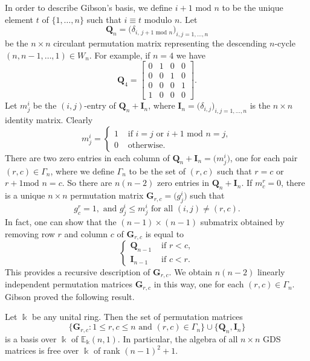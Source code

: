 \documentclass[ALCO,ThmDefs,Unicode,epreuves]{cedram}
\newcommand{\E}{\mathbb{E}}
\newcommand{\bQ}{\mathbf{Q}}
\newcommand{\bI}{\mathbf{I}}
\newcommand{\bG}{\mathbf{G}}
\begin{document}
In order to describe Gibson's basis, we define $i+1 \text{ mod } n$ to
be the unique element $t$ of $\{1, \dots, n\}$ such that $i \equiv t$
modulo $n$. Let
\[
\bQ_n = \big( \delta_{i,\, j+1 \text{ mod } n} \big)_{i,j = 1, \dots, n}
\]
be the $n \times n$ circulant permutation matrix representing the
descending $n$-cycle $(n, n-1, \dots, 1) \in W_n$. For example, if
$n=4$ we have
\[
\bQ_4 = 
\begin{bmatrix}
 0&1&0&0\\
 0&0&1&0\\
 0&0&0&1\\
 1&0&0&0
\end{bmatrix}.
\]
Let $m^i_j$ be the $(i,j)$-entry of $\bQ_n + \bI_n$, where $\bI_n =
\big( \delta_{i,j} \big)_{i,j = 1, \dots, n}$ is the $n \times n$
identity matrix. Clearly
\[ m^i_{j} = 
\begin{cases}
 1 & \text{ if } i=j \text{ or } i+1 \text{ mod } n = j,\\
 0 & \text{ otherwise.}
\end{cases}
\]
There are two zero entries in each column of $\bQ_n + \bI_n = \big(
m^i_{j} \big)$, one for each pair $(r,c) \in \Gamma_n$, where we define
$\Gamma_n$ to be the set of $(r,c)$ such that $r = c$ or $r+1 \text{
 mod } n = c$. So there are $n(n-2)$ zero entries in $\bQ_n +
\bI_n$. If $m^r_c = 0$, there is a unique $n \times n$ permutation
matrix $\bG_{r,c} = \big(g^i_j\big)$ such that
\[
g^r_c = 1, \text{ and } g^i_j \le m^i_j \text{ for all } (i,j) \ne (r,c).
\]
In fact, one can show that the $(n-1) \times (n-1)$ submatrix obtained
by removing row $r$ and column $c$ of $\bG_{r,c}$ is equal to
\[
 \begin{cases}
 \bQ_{n-1} & \text{ if } r<c,\\
 \bI_{n-1} & \text{ if } c<r.
 \end{cases}
\]
This provides a recursive description of $\bG_{r,c}$. We obtain
$n(n-2)$ linearly independent permutation matrices $\bG_{r,c}$ in this
way, one for each $(r,c) \in \Gamma_n$. Gibson proved the following
result.


\begin{theo}
Let $\Bbbk$ be any unital ring. Then the set of permutation matrices 
\[
 \{ \bG_{r,c}: 1 \le r,c \le n \text{ and } (r,c) \in \Gamma_n \}
 \cup \{ \bQ_n, \bI_n \}
\]
is a basis over $\Bbbk$ of $\E_\Bbbk(n,1)$. In particular, the algebra
of all $n \times n$ GDS matrices is free over $\Bbbk$ of rank $(n-1)^2
+ 1$.
\end{theo}
\end{document}
